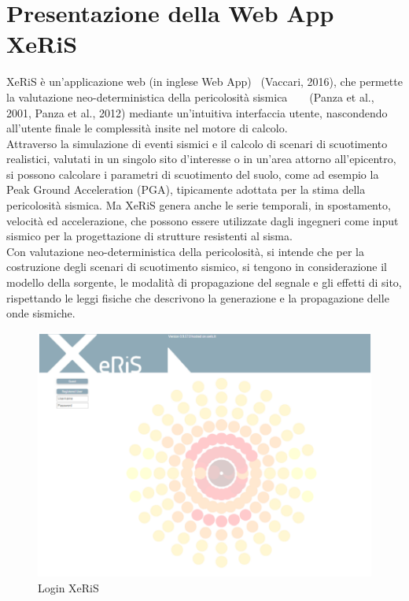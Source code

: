 \documentclass[a4paper,12pt,titlepage]{article}
\begin{document}
\section{Presentazione della Web App XeRiS}

XeRiS è un'applicazione web (in inglese Web App) ~\nocite{Vaccari2016}(Vaccari, 2016), che permette la valutazione neo-deterministica della pericolosità sismica ~\nocite{Panza2001} ~\nocite{Panza2012} (Panza et al., 2001, Panza et al., 2012) mediante un'intuitiva interfaccia utente, nascondendo all'utente finale le complessità insite nel motore di calcolo.\\
Attraverso la simulazione di eventi sismici e il calcolo di scenari di scuotimento realistici, valutati in un singolo sito d'interesse o in un'area attorno all'epicentro, si possono calcolare i parametri di scuotimento del suolo, come ad esempio la Peak Ground Acceleration (PGA), tipicamente adottata per la stima della pericolosità sismica. Ma XeRiS genera anche le serie temporali, in spostamento, velocità ed accelerazione, che possono essere utilizzate dagli ingegneri come input sismico per la progettazione di strutture resistenti al sisma.\\
Con valutazione neo-deterministica della pericolosità, si intende che per la costruzione degli scenari di scuotimento sismico, si tengono in considerazione il modello della sorgente, le modalità di propagazione del segnale e gli effetti di sito, rispettando le leggi fisiche che descrivono la generazione e la propagazione delle onde sismiche.\\

\begin{figure}[htbp]
 \centering
 \includegraphics[width=.5\linewidth]{Img/XerisLogIn.png}
 \caption{Login XeRiS}
 \label{fig:Login XeRiS2}
\end{figure}
\end{document}
